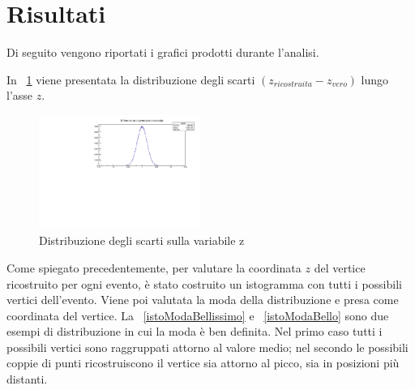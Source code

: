 \documentclass[11pt,a4paper]{article}
\begin{document}
\section{Risultati}
\label{sec:Risultati}
Di seguito vengono riportati i grafici prodotti durante l'analisi.
\par In \figurename~\ref{zDIff} viene presentata la distribuzione degli scarti $(z_{ricostruita}-z_{vero})$ lungo l'asse $z$.
\begin{figure}[h!]
    \centering
    \includegraphics[width=0.47\textwidth]{Immagini/zDiff.pdf}
    \vspace{-5pt}
    \caption{Distribuzione degli scarti sulla variabile z}
    \label{zDIff}
    \vspace{-10pt}
\end{figure}
\par \noindent Come spiegato precedentemente, per valutare la coordinata $z$ del vertice ricostruito per ogni evento, è stato costruito un istogramma con tutti i possibili vertici dell'evento. Viene poi valutata la moda della distribuzione e presa come coordinata del vertice. La \figurename~\ref{istoModaBellissimo} e \figurename~\ref{istoModaBello} sono due esempi di distribuzione in cui la moda è ben definita. Nel primo caso tutti i possibili vertici sono raggruppati attorno al valore medio; nel secondo le possibili coppie di punti ricostruiscono il vertice sia attorno al picco, sia in posizioni più distanti.
\end{document}
